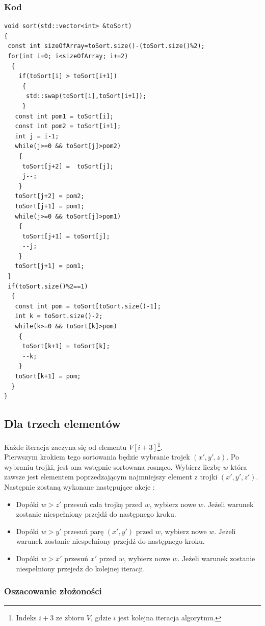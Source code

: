 \wyjT
\subsubsection{Kod}
\begin{lstlisting}[caption={Sortowanie przez wstawianie dla par},label={lst:wstawianie}]
void sort(std::vector<int> &toSort)
{
 const int sizeOfArray=toSort.size()-(toSort.size()%2);
 for(int i=0; i<sizeOfArray; i+=2)
  {
    if(toSort[i] > toSort[i+1])
     {
      std::swap(toSort[i],toSort[i+1]);
     }
   const int pom1 = toSort[i];
   const int pom2 = toSort[i+1];
   int j = i-1;
   while(j>=0 && toSort[j]>pom2)
    {
     toSort[j+2] =  toSort[j];
     j--;
    }
   toSort[j+2] = pom2;
   toSort[j+1] = pom1;
   while(j>=0 && toSort[j]>pom1)
    {
     toSort[j+1] = toSort[j];
     --j;
    }
   toSort[j+1] = pom1;
 }
 if(toSort.size()%2==1)
  {
   const int pom = toSort[toSort.size()-1];
   int k = toSort.size()-2;
   while(k>=0 && toSort[k]>pom)
    {
     toSort[k+1] = toSort[k];
     --k;
    }
   toSort[k+1] = pom;
  }
}
\end{lstlisting}

\subsection{Dla trzech elementów}
 Każde iteracja zaczyna się od elementu $V[i+3]$\footnote{Indeks $i+3$ ze zbioru $V$, gdzie $i$ jest kolejna iteracja algorytmu.}.\\
Pierwszym krokiem tego sortowania będzie wybranie  trojek $(x',y',z)$. Po wybraniu trojki, jest ona wstępnie sortowana rosnąco.
Wybierz liczbę $w$ która zawsze jest elementem poprzedzającym najmniejszy element z trojki $(x',y',z')$. Następnie zostaną wykonane następujące akcje :
\begin{itemize}
\item Dopóki $w > z'$ przesuń cala trojkę przed $w$, wybierz nowe $w$. Jeżeli warunek zostanie niespełniony przejdź do następnego kroku.
\item Dopóki $w > y'$ przesuń parę $(x',y')$ przed  $w$, wybierz nowe $w$. Jeżeli warunek zostanie niespełniony przejdź do następnego kroku.
\item Dopóki $w > x'$ przesuń $x'$ przed $w$, wybierz nowe $w$. Jeżeli warunek zostanie niespełniony przejedz do kolejnej iteracji.
\end{itemize}

\subsubsection{Oszacowanie złożoności}
